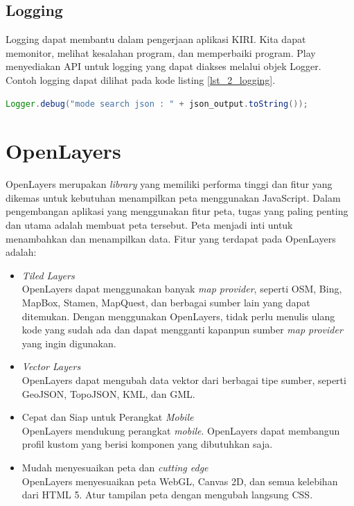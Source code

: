 \subsection{Logging}
Logging dapat membantu dalam pengerjaan aplikasi KIRI. Kita dapat memonitor, melihat kesalahan program, dan memperbaiki program. Play menyediakan API untuk logging yang dapat diakses melalui objek Logger. Contoh logging dapat dilihat pada kode listing \ref{lst_2_logging}.

\begin{lstlisting}[caption=Contoh logging menggunakan objek Logger,label = {lst_2_logging},language=Java]
	 Logger.debug("mode search json : " + json_output.toString());
\end{lstlisting} 
	


\section{OpenLayers}
\label{sec:openlayers}
OpenLayers \cite{openlayersbook} merupakan \textit{library} yang memiliki performa tinggi dan fitur yang dikemas untuk kebutuhan menampilkan peta menggunakan JavaScript. Dalam pengembangan aplikasi yang menggunakan fitur peta, tugas yang paling penting dan utama adalah membuat peta tersebut. Peta menjadi inti untuk menambahkan dan menampilkan data. Fitur yang terdapat pada OpenLayers adalah:

\begin{itemize}
\item \textit{Tiled Layers}\\
			OpenLayers dapat menggunakan banyak \textit{map provider}, seperti OSM, Bing, MapBox, Stamen, MapQuest, dan berbagai sumber lain yang dapat ditemukan. Dengan menggunakan OpenLayers, tidak perlu menulis ulang kode yang sudah ada dan dapat mengganti kapanpun sumber \textit{map provider} yang ingin digunakan.
	\item \textit{Vector Layers}\\
			OpenLayers dapat mengubah data vektor dari berbagai tipe sumber, seperti GeoJSON, TopoJSON, KML, dan GML.
	\item Cepat dan Siap untuk Perangkat \textit{Mobile}\\
			OpenLayers mendukung perangkat \textit{mobile}. OpenLayers dapat membangun profil kustom yang berisi komponen yang dibutuhkan saja.
	\item Mudah menyesuaikan peta dan \textit{cutting edge}\\
			OpenLayers menyesuaikan peta WebGL, Canvas 2D, dan semua kelebihan dari HTML 5. Atur tampilan peta dengan mengubah langsung CSS.
\end{itemize}

